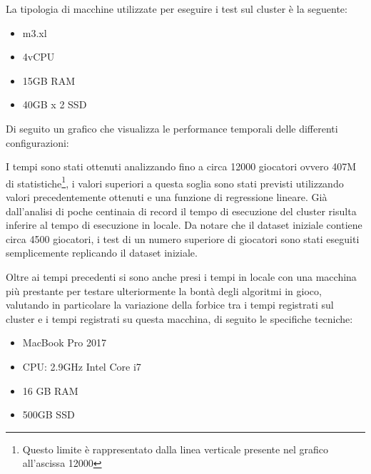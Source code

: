 \documentclass[10.5pt,a4paper,twocolumn]{article}
\begin{document}
La tipologia di macchine utilizzate per eseguire i test sul cluster è la seguente:
\begin{itemize}
	\setlength\itemsep{0.2em}
	\item m3.xl
	\item 4vCPU
	\item 15GB RAM
	\item 40GB x 2 SSD
\end{itemize}

Di seguito un grafico che visualizza le performance temporali delle differenti configurazioni:


I tempi sono stati ottenuti analizzando fino a circa 12000 giocatori ovvero 407M di statistiche\footnote{Questo limite è rappresentato dalla linea verticale presente nel grafico all'ascissa 12000}, i valori superiori a questa soglia sono stati previsti utilizzando valori precedentemente ottenuti e una funzione di regressione lineare. Già dall'analisi di poche centinaia di record il tempo di esecuzione del cluster risulta inferire al tempo di esecuzione in locale. Da notare che il dataset iniziale contiene circa 4500 giocatori, i test di un numero superiore di giocatori sono stati eseguiti semplicemente replicando il dataset iniziale.

Oltre ai tempi precedenti si sono anche presi i tempi in locale con una macchina più prestante per testare ulteriormente la bontà degli algoritmi in gioco, valutando in particolare la variazione della forbice tra i tempi registrati sul cluster e i tempi registrati su questa macchina, di seguito le specifiche tecniche: 
\begin{itemize}
	\setlength\itemsep{0.1em}
	\item MacBook Pro 2017
	\item CPU: 2.9GHz Intel Core i7
	\item 16 GB RAM
	\item 500GB SSD
\end{itemize}
\end{document}
